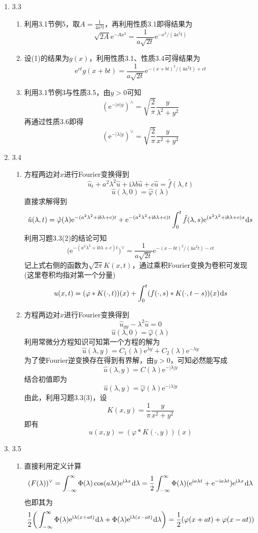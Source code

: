 \documentclass[a4paper,UTF8,fontset=windows,10pt]{ctexart}
\newcommand*{\dr}{\hspace{0.07em}\mathrm{d}}
\newcommand*{\er}{\mathrm{e}}
\newcommand*{\ir}{\mathrm{i}}
\begin{document}
\begin{enumerate}
    \item 3.3
    \begin{enumerate}[(1)]
        \item 利用3.1节例5，取$A=\frac{1}{4a^2t}$，再利用性质3.1即得结果为
        $$\sqrt{2A}\er^{-Ax^2}=\frac{1}{a\sqrt{2t}}\er^{-x^2/(4a^2t)}$$
        \item 设(1)的结果为$g(x)$，利用性质3.1、性质3.4可得结果为
        $$\er^{ct}g(x+bt)=\frac{1}{a\sqrt{2t}}\er^{-(x+bt)^2/(4a^2t)+ct}$$
        \item 利用3.1节例3与性质3.5，由$y>0$可知
        $$(\er^{-|x|y})^\wedge=\sqrt{\frac{2}{\pi}}\frac{y}{\lambda^2+y^2}$$
        再通过性质3.6即得
        $$(\er^{-|\lambda|y})^\vee=\sqrt{\frac{2}{\pi}}\frac{y}{x^2+y^2}$$
    \end{enumerate}
    
    \item 3.4
    \begin{enumerate}[(1)]
        \item 方程两边对$x$进行Fourier变换得到
        $$\hat{u}_t+a^2\lambda^2\hat{u}+\ir\lambda b\hat{u}+c\hat{u}=\hat{f}(\lambda,t)$$
        $$\hat{u}(\lambda,0)=\hat{\varphi}(\lambda)$$
        直接求解得到
        $$\hat{u}(\lambda,t)=\hat{\varphi}(\lambda)\er^{-(a^2\lambda^2+\ir b\lambda+c)t}+\er^{-(a^2\lambda^2+\ir b\lambda+c)t}\int_0^t\hat{f}(\lambda,s)\er^{(a^2\lambda^2+\ir b\lambda+c)s}\dr s$$
        利用习题3.3(2)的结论可知
        $$\big(\er^{-(a^2\lambda^2+\ir b\lambda+c)t}\big)^\vee=\frac{1}{a\sqrt{2t}}\er^{-(x-bt)^2/(4a^2t)-ct}$$
        记上式右侧的函数为$\sqrt{2\pi}K(x,t)$，通过乘积Fourier变换为卷积可发现(这里卷积均指对第一个分量)
        $$u(x,t)=(\varphi*K(\cdot,t))(x)+\int_0^t(f(\cdot,s)*K(\cdot,t-s))(x)\dr s$$
    
        \item 方程两边对$x$进行Fourier变换得到
        $$\hat{u}_{yy}-\lambda^2\hat{u}=0$$
        $$\hat{u}(\lambda,0)=\hat{\varphi}(\lambda)$$
        利用常微分方程知识可知第一个方程的解为
        $$\hat{u}(\lambda,y)=C_1(\lambda)\er^{\lambda y}+C_2(\lambda)\er^{-\lambda y}$$
        为了使Fourier逆变换存在得到有界解，由$y>0$，可知必然能写成
        $$\hat{u}(\lambda,y)=C(\lambda)\er^{-|\lambda|y}$$
        结合初值即为
        $$\hat{u}(\lambda,y)=\hat{\varphi}(\lambda)\er^{-|\lambda|y}$$
        由此，利用习题3.3(3)，设
        $$K(x,y)=\frac{1}{\pi}\frac{y}{x^2+y^2}$$
        即有
        $$u(x,y)=(\varphi*K(\cdot,y))(x)$$
    \end{enumerate}
    
    \item 3.5
    \begin{enumerate}[(1)]
        \item 直接利用定义计算
        $$(F(\lambda))^\vee=\int_{-\infty}^\infty\Phi(\lambda)\cos(a\lambda t)\er^{\ir\lambda x}\dr\lambda=\frac{1}{2}\int_{-\infty}^\infty\Phi(\lambda)(\er^{\ir a\lambda t}+\er^{-\ir a\lambda t})\er^{\ir\lambda x}\dr\lambda$$
        也即其为
        $$\frac{1}{2}\bigg(\int_{-\infty}^\infty\Phi(\lambda)\er^{\ir\lambda(x+at)}\dr\lambda+\Phi(\lambda)\er^{\ir\lambda(x-at)}\dr\lambda\bigg)=\frac{1}{2}(\varphi(x+at)+\varphi(x-at))$$
        

\end{enumerate}
\end{enumerate}
\end{document}
